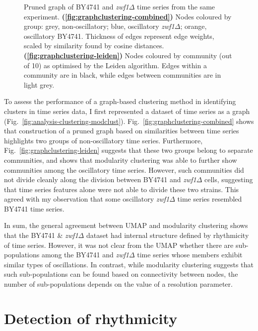 \begin{figure}[htbp]
  \caption[
    Pruned graph of BY4741 and \textit{zwf1$\Delta$} time series from the same experiment.
  ]{
    Pruned graph of BY4741 and \textit{zwf1$\Delta$} time series from the same experiment.
    \textbf{(\ref{fig:graphclustering-combined})}
    Nodes coloured by group: grey, non-oscillatory; blue, oscillatory \textit{zwf1$\Delta$}; orange, oscillatory BY4741.
    Thickness of edges represent edge weights, scaled by similarity found by cosine distances.
    \textbf{(\ref{fig:graphclustering-leiden})}
    Nodes coloured by community (out of 10) as optimised by the Leiden algorithm.
    Edges within a community are in black, while edges between communities are in light grey.
  }
  \label{fig:graphclustering}
\end{figure}


To assess the performance of a graph-based clustering method in identifying clusters in time series data, I first represented a dataset of time series as a graph (Fig.\ \ref{fig:analysis-clustering-modclust}).
Fig.\ \ref{fig:graphclustering-combined} shows that construction of a pruned graph based on similarities between time series highlights two groups of non-oscillatory time series.
Furthermore, Fig.\ \ref{fig:graphclustering-leiden} suggests that these two groups belong to separate communities, and shows that modularity clustering was able to further show communities among the oscillatory time series.
However, such communities did not divide cleanly along the division between BY4741 and \textit{zwf1$\Delta$} cells, suggesting that time series features alone were not able to divide these two strains.
This agreed with my observation that some oscillatory \textit{zwf1$\Delta$} time series resembled BY4741 time series.


In sum, the general agreement between UMAP and modularity clustering shows that the BY4741 \& \textit{zwf1$\Delta$} dataset had internal structure defined by rhythmicity of time series.
However, it was not clear from the UMAP whether there are sub-populations among the BY4741 and \textit{zwf1$\Delta$} time series whose members exhibit similar types of oscillations.
In contrast, while modularity clustering suggests that such sub-populations can be found based on connectivity between nodes, the number of sub-populations depends on the value of a resolution parameter.


\section{Detection of rhythmicity}
\label{sec:analysis-classification}

